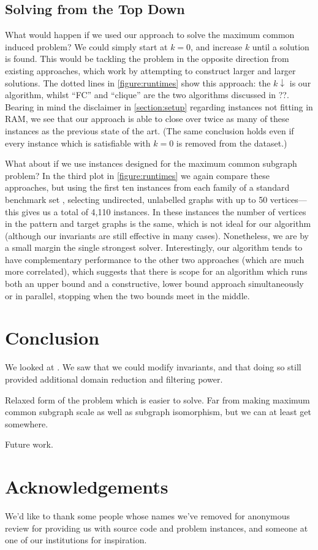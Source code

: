 \documentclass[letterpaper]{article}
\newcommand{\citep}[1]{\cite{#1}}
\theoremstyle{definition}
\begin{document}
\subsection{Solving from the Top Down}

What would happen if we used our approach to solve the maximum common induced problem? We could
simply start at $k = 0$, and increase $k$ until a solution is found. This would be tackling the
problem in the opposite direction from existing approaches, which work by attempting to construct
larger and larger solutions. The dotted lines in \cref{figure:runtimes} show this approach: the $k
\downarrow$ is our algorithm, whilst ``FC'' and ``clique'' are the two algorithms discussed in ??.
Bearing in mind the disclaimer in \cref{section:setup} regarding instances not fitting in RAM, we
see that our approach is able to close over twice as many of these instances as the previous state
of the art. (The same conclusion holds even if every instance which is satisfiable with $k = 0$ is
removed from the dataset.)

What about if we use instances designed for the maximum common subgraph problem? In the third plot
in \cref{figure:runtimes} we again compare these approaches, but using the first ten instances from
each family of a standard benchmark set
\citep{DBLP:journals/prl/SantoFSV03,DBLP:journals/jgaa/ConteFV07}, selecting undirected, unlabelled
graphs with up to 50 vertices---this gives us a total of 4,110 instances. In these instances the
number of vertices in the pattern and target graphs is the same, which is not ideal for our
algorithm (although our invariants are still effective in many cases). Nonetheless, we are by a
small margin the single strongest solver. Interestingly, our algorithm tends to have complementary
performance to the other two approaches (which are much more correlated), which suggests that there
is scope for an algorithm which runs both an upper bound and a constructive, lower bound approach
simultaneously or in parallel, stopping when the two bounds meet in the middle.

\section{Conclusion}

We looked at . We saw that we could modify invariants, and that doing so still provided additional
domain reduction and filtering power.

Relaxed form of the problem which is easier to solve. Far from making maximum common subgraph scale
as well as subgraph isomorphism, but we can at least get somewhere.

Future work.

\section*{Acknowledgements}

We'd like to thank some people whose names we've removed for anonymous review for providing us with
source code and problem instances, and someone at one of our institutions for inspiration.

\FloatBarrier



\end{document}
